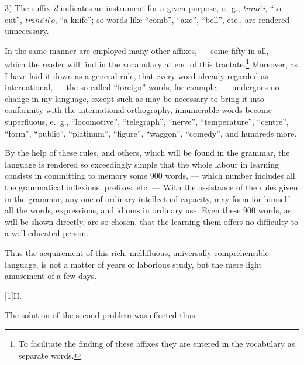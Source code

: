 \documentclass[12pt,twoside]{book}
\begin{document}
3) The suffix \emph{il} indicates an instrument for a given purpose, e.~g., \emph{tranĉ\,i}, “to cut”, \emph{tranĉ\,il\,o}, “a knife”; so words like “comb”, “axe”, “bell”, etc., are rendered unnecessary.

In the same manner are employed many other affixes, --- some fifty in all, --- which the reader will find in the vocabulary at end of this tractate.\footnote{To facilitate the finding of these affixes they are entered in the vocabulary as separate words.} Moreover, as I have laid it down as a general rule, that every word already regarded as international, --- the so-called “foreign” words, for example, --- undergoes no change in my language, except such as may be necessary to bring it into conformity with the international orthography, innumerable words become superfluous, e.~g., “locomotive”, “telegraph”, “nerve”, “temperature”, “centre”, “form”, “public”, “platinum”, “figure”, “waggon”, “comedy”, and hundreds more.

By the help of these rules, and others, which will be found in the grammar, the language is rendered so exceedingly simple that the whole labour in learning consists in committing to memory some 900 words, --- which number includes all the grammatical inflexions, prefixes, etc. --- With the assistance of the rules given in the grammar, any one of ordinary intellectual capacity, may form for himself all the words, expressions, and idioms in ordinary use. Even these 900 words, as will be shown directly, are so chosen, that the learning them offers no difficulty to a well-educated person.

Thus the acquirement of this rich, mellifluous, universally-comprehensible language, is not a matter of years of laborious study, but the mere light amusement of a few days. 

\vspace{12pt}

{\hfil \scalebox{2}[1]{\large\cowboyfont II.}}

\vspace{12pt}

The solution of the second problem was effected thus:
\end{document}
